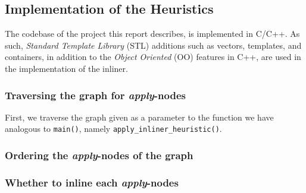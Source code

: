 \subsection{Implementation of the Heuristics}

The codebase of the project this report describes, is implemented in C/C++. As
such, \textit{Standard Template Library} (STL) additions such as vectors,
templates, and containers, in addition to the \textit{Object Oriented} (OO)
features in C++, are used in the implementation of the inliner.

\subsubsection{Traversing the graph for \textit{apply}-nodes}

First, we traverse the graph given as a parameter to the function we have
analogous to \lstinline[style=customcpp]!main()!, namely
\lstinline[style=customcpp]!apply_inliner_heuristic()!.

\subsubsection{Ordering the \textit{apply}-nodes of the graph}

\subsubsection{Whether to inline each \textit{apply}-nodes}
